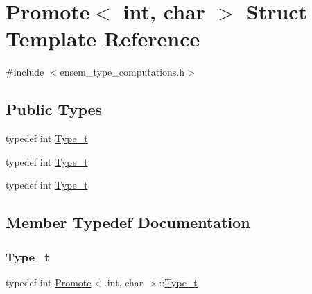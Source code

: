 \hypertarget{structPromote_3_01int_00_01char_01_4}{}\section{Promote$<$ int, char $>$ Struct Template Reference}
\label{structPromote_3_01int_00_01char_01_4}


{\ttfamily \#include $<$ensem\+\_\+type\+\_\+computations.\+h$>$}

\subsection*{Public Types}
\begin{DoxyCompactItemize}
\item 
typedef int \mbox{\hyperlink{structPromote_3_01int_00_01char_01_4_a0e318e07696fbce55dd03513e6452a2c}{Type\+\_\+t}}
\item 
typedef int \mbox{\hyperlink{structPromote_3_01int_00_01char_01_4_a0e318e07696fbce55dd03513e6452a2c}{Type\+\_\+t}}
\item 
typedef int \mbox{\hyperlink{structPromote_3_01int_00_01char_01_4_a0e318e07696fbce55dd03513e6452a2c}{Type\+\_\+t}}
\end{DoxyCompactItemize}


\subsection{Member Typedef Documentation}
\mbox{\label{structPromote_3_01int_00_01char_01_4_a0e318e07696fbce55dd03513e6452a2c}} 
\subsubsection{\texorpdfstring{Type\_t}{Type\_t}\hspace{0.1cm}{\footnotesize\ttfamily [1/3]}}
{\footnotesize\ttfamily typedef int \mbox{\hyperlink{structPromote}{Promote}}$<$ int, char $>$\+::\mbox{\hyperlink{structPromote_3_01int_00_01char_01_4_a0e318e07696fbce55dd03513e6452a2c}{Type\+\_\+t}}}

\mbox{\label{structPromote_3_01int_00_01char_01_4_a0e318e07696fbce55dd03513e6452a2c}} 
